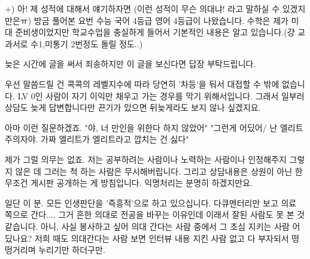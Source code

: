     \vspace{5mm}

    +) 아! 제 성적에 대해서 얘기하자면 (이런 성적이 무슨 의대냐! 라고 말하실 수 있겠지만은ㅠ) 방금 풀어본 요번 수능 국어 4등급 영어 4등급이 나왔습니다. 수학은 제가 미대 준비생이었지만 학교수업을 충실하게 들어서 기본적인 내용은 알고 있습니다.(걍 교과서로 수1,미통기 2번정도 돌릴 정도..)
    \vspace{5mm}

    늦은 시간에 글을 써서 죄송하지만 이 글을 보신다면 답장 부탁드립니다.
    \vspace{5mm}

우선 말씀드릴 건 콕콕의 레벨지수에 따라 당연히 '차등'을 둬서 대접할 수 밖에 없습니다.
LV 0인 사람이 자기 이익만 채우고 가는 경우를 막기 위해서입니다. 그래서 일부러 상담도 늦게 답변합니다만
끈기가 있으면 뒤늦게라도 보지 않나 싶겠지요.
\vspace{5mm}

아마 이런 질문하겠죠.
"야, 너 만인을 위한다 하지 않았어"
"그런게 어딨어/ 난 엘리트주의자야. 가짜 엘리트가 엘리트라고 깝치는 건 싫다"
\vspace{5mm}

제가 그럴 의무는 없죠. 저는 공부하려는 사람이나 노력하는 사람이나 인정해주지
그렇지 않은 데 그러는 척 하는 사람은 무시해버립니다.
그리고 상담내용은 상원이 아닌 한 무조건 게시판 공개하는 게 방침입니다. 익명처리는 분명히 하겠지만요.
\vspace{5mm}

일단 이 분. 모든 인생판단을 '즉흥적'으로 하고 있으십니다.
다큐멘터리만 보고 의료 쪽으로 간다.... 그거 흔한 의대로 전공을 바꾸는 이유인데 이래서 잘된 사람도 못 본 것 같습니다.
아니, 사실 봉사하고 싶어 의대 간다는 사람 중에서 그 초심 지키는 사람 어딨나요?
저희 때도 의대간다는 사람 보면 인터뷰 내용 지킨 사람 없고 다 부자되서 떵떵거리며 누리기만 하더구만.
\vspace{5mm}

